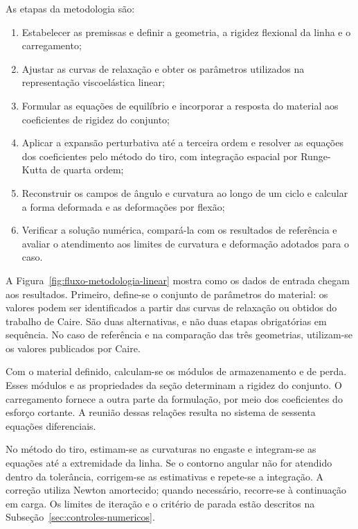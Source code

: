 \documentclass[arial,centeredequations,english,brazilian,oneside,section=TITLE]{ifes8}
\begin{document}
As etapas da metodologia são:
\begin{enumerate}
  \item Estabelecer as premissas e definir a geometria, a rigidez flexional da linha e o
  carregamento;
  \item Ajustar as curvas de relaxação e obter os parâmetros utilizados na representação
  viscoelástica linear;
  \item Formular as equações de equilíbrio e incorporar a resposta do material aos
  coeficientes de rigidez do conjunto;
  \item Aplicar a expansão perturbativa até a terceira ordem e resolver as equações dos
  coeficientes pelo método do tiro, com integração espacial por Runge-Kutta de quarta ordem;
  \item Reconstruir os campos de ângulo e curvatura ao longo de um ciclo e calcular a forma
  deformada e as deformações por flexão;
  \item Verificar a solução numérica, compará-la com os resultados de referência e avaliar
  o atendimento aos limites de curvatura e deformação adotados para o caso.
\end{enumerate}

A Figura~\ref{fig:fluxo-metodologia-linear} mostra como os dados de entrada
chegam aos resultados. Primeiro, define-se o conjunto de parâmetros do material:
os valores podem ser identificados a partir das curvas de relaxação ou
obtidos do trabalho de Caire. São duas alternativas, e não duas etapas
obrigatórias em sequência. No caso de referência e na comparação das três
geometrias, utilizam-se os valores publicados por Caire.

Com o material definido, calculam-se os módulos de armazenamento e de perda.
Esses módulos e as propriedades da seção determinam a rigidez do conjunto.
O carregamento fornece a outra parte da formulação, por meio dos coeficientes
do esforço cortante. A reunião dessas relações resulta no sistema de sessenta
equações diferenciais.

No método do tiro, estimam-se as curvaturas no engaste e integram-se as equações
até a extremidade da linha. Se o contorno angular não for atendido dentro da
tolerância, corrigem-se as estimativas e repete-se a integração. A correção
utiliza Newton amortecido; quando necessário, recorre-se à continuação em
carga. Os limites de iteração e o critério de parada estão descritos na
Subseção~\ref{sec:controles-numericos}.
\end{document}
